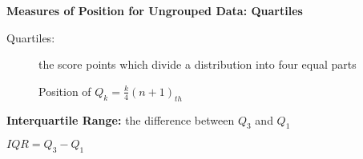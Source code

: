 \begin{center}
\textbf{Measures of Position for Ungrouped Data: Quartiles}
\end{center}

\vspace*{1ex}

\begin{description}
\item[Quartiles: ]  the score points which divide a distribution into four 
equal parts
\begin{center}
Position of $Q_k = \displaystyle \frac{k}{4}(n+1)_{th} $
\end{center} 
\end{description} 

\textbf{Interquartile Range:}  the difference between $Q_3$ and $Q_1$
\begin{center}
$IQR = Q_3 - Q_1$
\end{center} 
